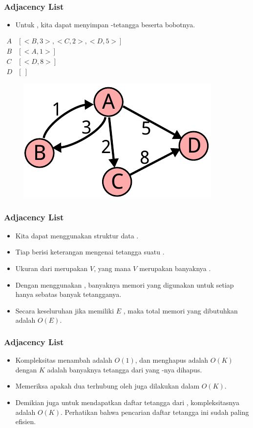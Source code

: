 \begin{frame}
\frametitle{Adjacency List}
\begin{itemize}
  \item Untuk  \fgraph, kita dapat menyimpan \fnode-\fnode tetangga beserta bobotnya.
\end{itemize}
\begin{center}
\begin{multicols}{2}
  $\begin{array}{r|l}
    A & [<B,3> , <C,2>, <D,5>] \\
    B & [<A,1>] \\
    C & [<D,8>] \\
    D & [\ ]
  \end{array}$
  \break
  \begin{figure}
    \includegraphics[width=4 cm]{asset/weighted-directed.pdf}
  \end{figure}
\end{multicols} 
\end{center}
\end{frame}

\begin{frame}
\frametitle{Adjacency List}
\begin{itemize}
  \item Kita dapat menggunakan struktur data .
  \item Tiap \flist berisi keterangan mengenai tetangga suatu \fnode.
  \item Ukuran dari \farray merupakan $V$, yang mana $V$ merupakan banyaknya \fnode.
  \item Dengan menggunakan \flist, banyaknya memori yang digunakan untuk setiap \fnode hanya sebatas banyak tetangganya.
  \item Secara keseluruhan jika \fgraph memiliki $E$ \fedge, maka total memori yang dibutuhkan adalah $O(E)$.
\end{itemize}
\end{frame}

\begin{frame}
\frametitle{Adjacency List}
\begin{itemize}
  \item Kompleksitas menambah \fedge adalah $O(1)$, dan menghapus adalah $O(K)$ dengan $K$ adalah banyaknya tetangga dari \fnode yang \fedge-nya dihapus.
  \item Memeriksa apakah dua \fnode terhubung oleh \fedge juga dilakukan dalam $O(K)$.
  \item Demikian juga untuk mendapatkan daftar tetangga dari \fnode, kompleksitasnya adalah $O(K)$. Perhatikan bahwa pencarian daftar tetangga ini sudah paling efisien.
\end{itemize}
\end{frame}

